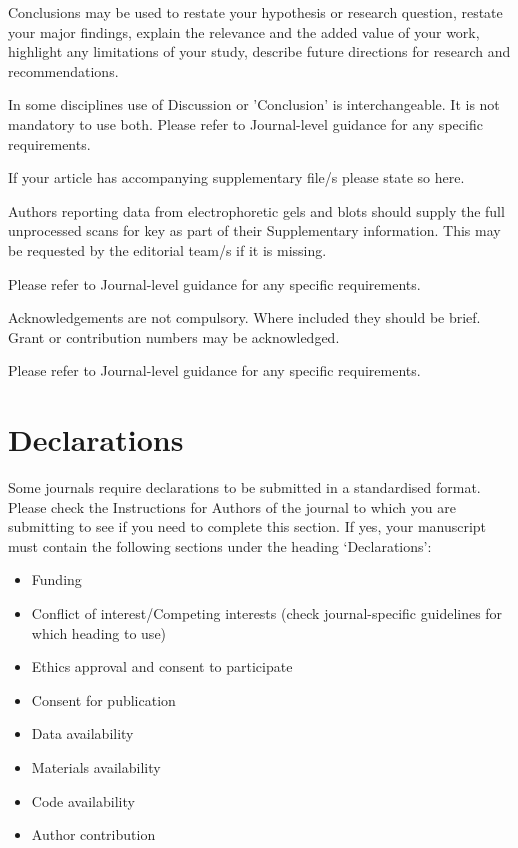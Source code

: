 \documentclass[pdflatex,sn-basic]{sn-jnl}           %
\theoremstyle{thmstyleone}%
\theoremstyle{thmstyletwo}%
\theoremstyle{thmstylethree}%
\begin{document}
Conclusions may be used to restate your hypothesis or research question, restate your major findings, explain the relevance and the added value of your work, highlight any limitations of your study, describe future directions for research and recommendations. 

In some disciplines use of Discussion or 'Conclusion' is interchangeable. It is not mandatory to use both. Please refer to Journal-level guidance for any specific requirements. 

\backmatter


If your article has accompanying supplementary file/s please state so here. 

Authors reporting data from electrophoretic gels and blots should supply the full unprocessed scans for key as part of their Supplementary information. This may be requested by the editorial team/s if it is missing.

Please refer to Journal-level guidance for any specific requirements.


Acknowledgements are not compulsory. Where included they should be brief. Grant or contribution numbers may be acknowledged.

Please refer to Journal-level guidance for any specific requirements.

\section*{Declarations}

Some journals require declarations to be submitted in a standardised format. Please check the Instructions for Authors of the journal to which you are submitting to see if you need to complete this section. If yes, your manuscript must contain the following sections under the heading `Declarations':

\begin{itemize}
\item Funding
\item Conflict of interest/Competing interests (check journal-specific guidelines for which heading to use)
\item Ethics approval and consent to participate
\item Consent for publication
\item Data availability 
\item Materials availability
\item Code availability 
\item Author contribution
\end{itemize}
\end{document}
